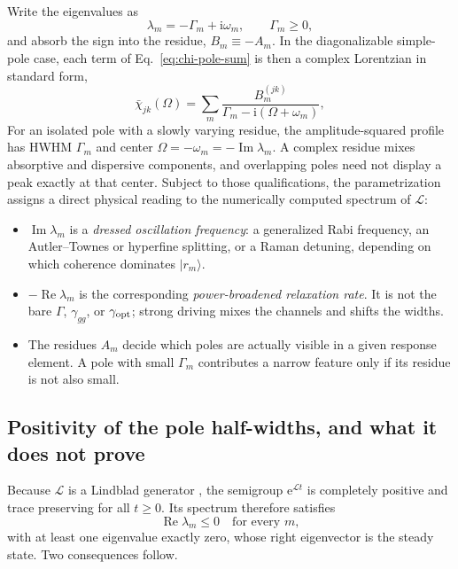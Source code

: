 \documentclass[11pt,a4paper]{article}
\newcommand{\ii}{\mathrm i}
\newcommand{\e}{\mathrm e}
\newcommand{\Rea}{\operatorname{Re}}
\newcommand{\Ima}{\operatorname{Im}}
\newcommand{\chibar}{\bar\chi}
\newcommand{\ket}[1]{\lvert #1\rangle}
\begin{document}
Write the eigenvalues as
\begin{equation}
\lambda_m=-\Gamma_m+\ii\omega_m,\qquad \Gamma_m\geq0 ,
\label{eq:pole-parametrization}
\end{equation}
and absorb the sign into the residue, $B_m\equiv-A_m$. In the diagonalizable
simple-pole case, each term of
Eq.~\eqref{eq:chi-pole-sum} is then a complex Lorentzian in standard form,
\begin{equation}
\chibar_{jk}(\Omega)=\sum_m
\frac{B^{(jk)}_m}{\Gamma_m-\ii(\Omega+\omega_m)} ,
\label{eq:lorentzian-term}
\end{equation}
For an isolated pole with a slowly varying residue, the amplitude-squared
profile has HWHM $\Gamma_m$ and center
$\Omega=-\omega_m=-\Ima\lambda_m$. A complex residue mixes absorptive and
dispersive components, and overlapping poles need not display a peak exactly at
that center. Subject to those qualifications, the parametrization assigns a
direct physical reading to the numerically computed spectrum
of $\mathcal L$:
\begin{itemize}
\item $\Ima\lambda_m$ is a \emph{dressed oscillation frequency}: a
generalized Rabi frequency, an Autler--Townes or hyperfine splitting, or a
Raman detuning, depending on which coherence dominates $\ket{r_m}$.
\item $-\Rea\lambda_m$ is the corresponding \emph{power-broadened relaxation
rate}. It is not the bare $\Gamma$, $\gamma_{gg}$, or $\gamma_{\rm opt}$;
strong driving mixes the channels and shifts the widths.
\item The residues $A_m$ decide which poles are actually visible in a given
response element. A pole with small $\Gamma_m$ contributes a narrow feature
only if its residue is not also small.
\end{itemize}

\subsection{Positivity of the pole half-widths, and what it does not prove}
\label{sec:pole-positivity}

Because $\mathcal L$ is a Lindblad generator \cite{GKS1976}, the semigroup $\e^{\mathcal Lt}$ is
completely positive and trace preserving for all $t\geq0$. Its spectrum
therefore satisfies
\begin{equation}
\Rea\lambda_m\leq0\quad\text{for every }m,
\label{eq:gksl-spectrum}
\end{equation}
with at least one eigenvalue exactly zero, whose right eigenvector is the
steady state. Two consequences follow.
\end{document}
